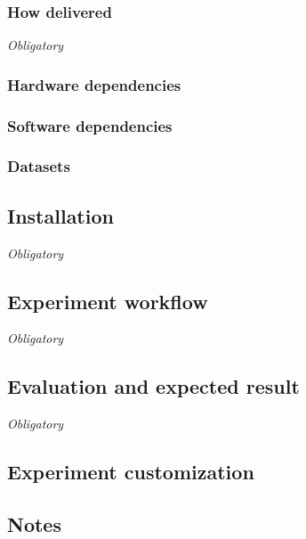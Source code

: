 \documentclass{sigplanconf}
\begin{document}
\subsubsection{How delivered}

{\em Obligatory}

\subsubsection{Hardware dependencies}

\subsubsection{Software dependencies}

\subsubsection{Datasets}

\subsection{Installation}

{\em Obligatory}

\subsection{Experiment workflow}

{\em Obligatory}

\subsection{Evaluation and expected result}

{\em Obligatory}

\subsection{Experiment customization}

\subsection{Notes}

\end{document}
